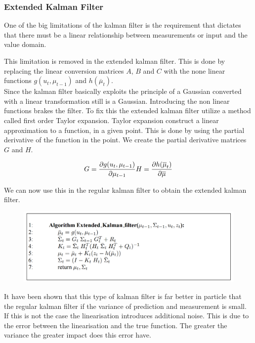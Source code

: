 \subsubsection{Extended Kalman Filter}
One of the big limitations of the kalman filter is the requirement that dictates that there must be a linear relationship between measurements or input and the value domain. 

This limitation is removed in the extended kalman filter. This is done by replacing the linear conversion matrices $A$, $B$ and $C$ with the none linear functions $g(u_t, \mu_{t-1})$ and $h(\overline{\mu}_t)$.\\

Since the kalman filter basically exploits the principle of a Gaussian converted with a linear transformation still is a Gaussian. Introducing the non linear functions brakes the filter. To fix this the extended kalman filter utilize a method called first order Taylor expansion. Taylor expansion construct a linear approximation to a function, in a given point. This is done by using the partial derivative of the function in the point. We create the partial derivative matrices $G$ and $H$.

\begin{equation}
G = \frac{\partial g(u_t, \mu_{t-1})}{\partial \mu_{t-1}} \\ H = \frac{\partial h(\overline{\mu}_t)}{\partial \overline{\mu}}
\label{Mes3}
\end{equation}

We can now use this in the regular kalman filter to obtain the extended kalman filter.

\begin{figure}[H]
\includegraphics[scale=0.51]{billeder/EKF.png}
\end{figure}

It have been shown that this type of kalman filter is far better in particle that the regular kalman filter if the variance of prediction and measurement is small. If this is not the case the linearisation introduces additional noise. This is due to the error between the linearisation and the true function. The greater the variance the greater impact does this error have.  
